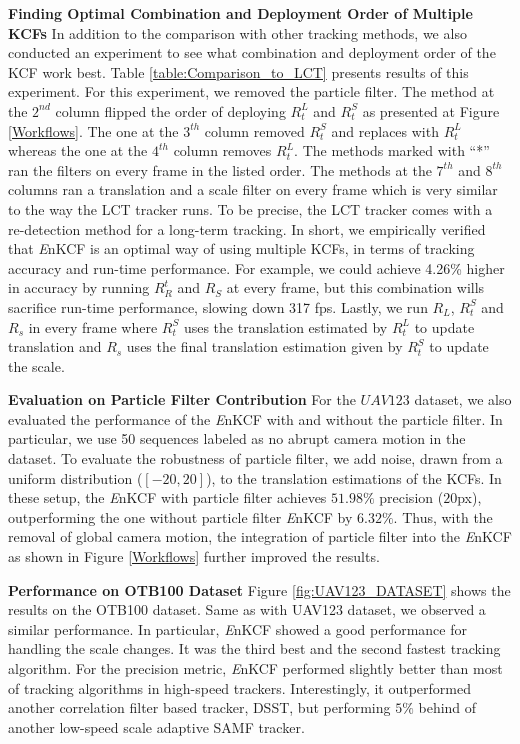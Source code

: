 \documentclass[10pt,twocolumn,letterpaper]{article}
\begin{document}
\textbf{Finding Optimal Combination and Deployment Order of Multiple
  KCFs} In addition to the comparison with other tracking methods, we
also conducted an experiment to see what combination and deployment
order of the KCF work best. Table \ref{table:Comparison_to_LCT}
presents results of this experiment. For this experiment, we removed
the particle filter. The method at the $2^{nd}$ column flipped the
order of deploying $R_{t}^{L}$ and $R_{t}^{S}$ as presented at Figure
\ref{Workflows}. The one at the $3^{th}$ column removed $R_{t}^{S}$
and replaces with $R_{t}^{L}$ whereas the one at the $4^{th}$ column
removes $R_{t}^{L}$. The methods marked with ``*'' ran the filters on
every frame in the listed order. The methods at the $7^{th}$ and
$8^{th}$ columns ran a translation and a scale filter on every frame
which is very similar to the way the LCT tracker \cite{ma2015long}
runs. To be precise, the LCT tracker comes with a re-detection method
for a long-term tracking. In short, we empirically verified that
\textit{E}nKCF is an optimal way of using multiple KCFs, in terms of
tracking accuracy and run-time performance. For example, we could
achieve 4.26\% higher in accuracy by running $R_{R}^{t}$ and $R_{S}$
at every frame, but this combination wills sacrifice run-time
performance, slowing down 317 fps. Lastly, we run $R_{L}$, $R_{t}^{S}$
and $R_{s}$ in every frame where $R_{t}^{S}$ uses the translation
estimated by $R_{t}^{L}$ to update translation and $R_{s}$ uses the
final translation estimation given by $R_{t}^{S}$ to update the scale.

\textbf{Evaluation on Particle Filter Contribution} For the $UAV123$
dataset, we also evaluated the performance of the {\it E}nKCF with and
without the particle filter. In particular, we use 50 sequences
labeled as no abrupt camera motion in the dataset. To evaluate the
robustness of particle filter, we add noise, drawn from a uniform
distribution ($[-20,20]$), to the translation estimations of the
KCFs. In these setup, the {\it E}nKCF with particle filter achieves
$51.98\%$ precision ($20$px), outperforming the one without particle
filter {\it E}nKCF by $6.32\%$. Thus, with the removal of global
camera motion, the integration of particle filter into the {\it E}nKCF
as shown in Figure \ref{Workflows} further improved the results.

\textbf{Performance on OTB100 Dataset} Figure \ref{fig:UAV123_DATASET}
shows the results on the OTB100 dataset. Same as with UAV123 dataset,
we observed a similar performance. In particular, {\it E}nKCF showed a
good performance for handling the scale changes. It was the third best
and the second fastest tracking algorithm. For the precision metric,
{\it E}nKCF performed slightly better than most of tracking algorithms
in high-speed trackers. Interestingly, it outperformed another
correlation filter based tracker, DSST, but performing $5\%$ behind of
another low-speed scale adaptive SAMF tracker.
\end{document}

